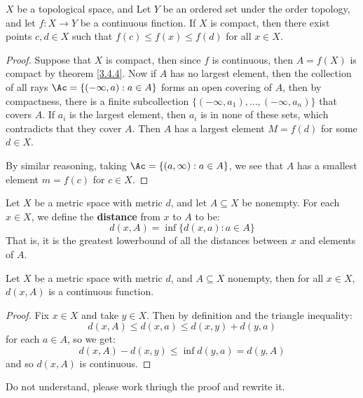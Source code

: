 \begin{theorem}\label{3.6.3}
    $X$ be a topological space, and  Let $Y$ be an ordered set under the order
    topology, and let $f:X \rightarrow Y$ be a continuous finction. If $X$ is
    compact, then there exist points  $c,d \in X$ such that  $f(c) \leq f(x)
    \leq f(d)$ for all $x \in X$.
\end{theorem}
\begin{proof}
    Suppose that $X$ is compact, then since  $f$ is continuous, then $A=f(X)$ is
    compact by theorem \ref{3.4.4}. Now if  $A$ has no largest element,
    then the collection of all rays $\Ac=\{(-\infty,a) : a \in A\}$ forms an
    open covering of $A$, then by compactness, there is a finite subcollection
    $\{(-\infty,a_1), \dots, (-\infty,a_n)\}$ that covers $A$. If  $a_i$ is the
    largest element, then  $a_i$ is in none of these sets, which contradicts
    that they cover  $A$. Then $A$ has a largest element  $M=f(d)$ for some $d
    \in X$.

    By similar reasoning, taking  $\Ac=\{(a,\infty) : a \in A\}$, we see that
    $A$ has a smallest element  $m=f(c)$ for $c \in X$.
\end{proof}

\begin{definition}
    Let $X$ be a metric space with metric $d$, and let  $A \subseteq X$ be
    nonempty. For each  $x \in X$, we define the  \textbf{distance} from $x$ to
     $A$ to be:
     \begin{equation}
         d(x,A) = \inf\{d(x,a) : a \in A\}
     \end{equation}
     That is, it is the greatest lowerbound of all the distances between $x$ and
     elements of $A$.
\end{definition}

\begin{lemma}\label{3.6.4}
    Let $X$ be a metric space with metric $d$, and $A \subseteq X$ nonempty,
    then for all  $x \in X$,  $d(x,A)$ is a continuous function.
\end{lemma}
\begin{proof}
    Fix $x \in X$ and take  $y \in X$. Then by definition and the triangle
    inequality:
    \begin{equation*}
        d(x,A) \leq d(x,a) \leq d(x,y)+d(y,a)
    \end{equation*}
    for each $a \in A$, so we get:
    \begin{equation*}
        d(x,A)-d(x,y) \leq \inf{d(y,a)}=d(y,A)
    \end{equation*}
    and so $d(x,A)$ is continuous.
\end{proof}
\begin{remark}
    Do not understand, please work thriugh the proof and rewrite it.
\end{remark}

